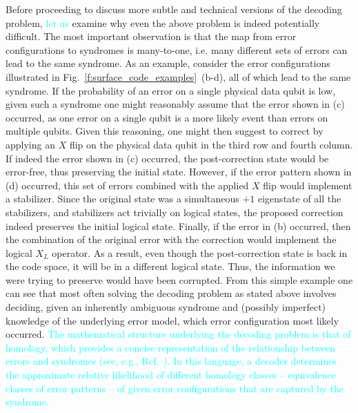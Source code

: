 \documentclass[twocolumn,preprintnumbers,amsmath,amssymb,notitlepage,nofootinbib,longbibliography,superscriptaddress,aps,pra,10pt]{revtex4-1}
\newcommand{\je}[1]{\textcolor{cyan}{#1}}
\begin{document}
	\noindent Before proceeding to discuss more subtle and technical versions of the decoding problem, \je{let us} examine why even the above problem is indeed potentially difficult.
	The most important observation is that the map from error configurations to syndromes is many-to-one, i.e. many different sets of errors can lead to the same syndrome.
	As an example, consider the error configurations illustrated in Fig.~\ref{f:surface_code_examples}~(b-d), all of which lead to the same syndrome.
	If the probability of an error on a single physical data qubit is low, given such a syndrome one might reasonably assume that the error shown in (c) occurred, as one error on a single qubit is a more likely event than errors on multiple qubits.
	Given this reasoning, one might then suggest to correct by applying an $X$ flip on the physical data qubit in the third row and fourth column.
	If indeed the error shown in (c) occurred, the post-correction state would be error-free, thus preserving the initial state.
	However, if the error pattern shown in (d) occurred, this set of errors combined with the applied $X$ flip would implement a stabilizer.
	Since the original state was a simultaneous $+1$ eigenstate of all the stabilizers, and stabilizers act trivially on logical states, the proposed correction indeed preserves the initial logical state.
	Finally, if the error in (b) occurred, then the combination of the original error with the correction would implement the logical $X_L$ operator.
	As a result, even though the post-correction state is back in the code space, it will be in a different logical state.
	Thus, the information we were trying to preserve would have been corrupted.
	From this simple example one can see that most often solving the decoding problem as stated above involves deciding, given an inherently ambiguous syndrome and (possibly imperfect) knowledge of the underlying error model, which error configuration most likely occurred.
\je{The mathematical structure underlying the decoding problem is that of homology, which provides a 
	concise representation of the relationship between errors and syndromes (see, e.g., Ref.\ \cite{FastDecoders}). In this language,
	a decoder determines the approximate relative likelihood of different homology classes -- equivalence classes of 
	error patterns -- of given error configurations that are 
	captured by the syndrome.}
\end{document}
